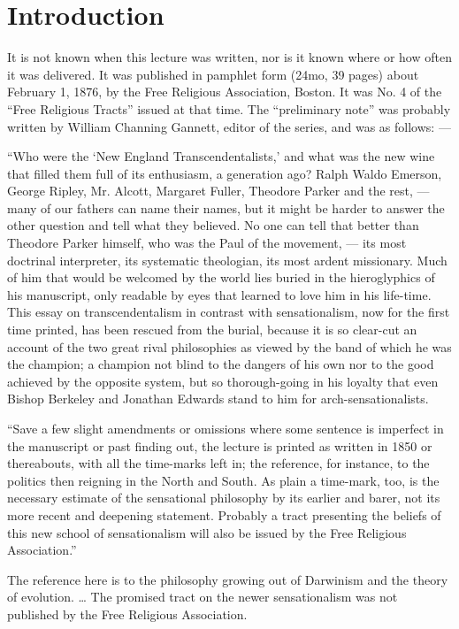 \documentclass[12pt]{article}
\begin{document}
\section*{Introduction}

It is not known when this lecture was written, nor is it known where or how often it was delivered. It was published in pamphlet form (24mo, 39 pages) about February 1, 1876, by the Free Religious Association, Boston. It was No. 4 of the ``Free Religious Tracts'' issued at that time. The ``preliminary note'' was probably written by William Channing Gannett, editor of the series, and was as follows: ---


``Who were the `New England Transcendentalists,' and what was the new wine that filled them full of its enthusiasm, a generation ago? Ralph Waldo Emerson, George Ripley, Mr. Alcott, Margaret Fuller, Theodore Parker and the rest, --- many of our fathers can name their names, but it might be harder to answer the other question and tell what they believed. No one can tell that better than Theodore Parker himself, who was the Paul of the movement, --- its most doctrinal interpreter, its systematic theologian, its most ardent missionary. Much of him that would be welcomed by the world lies buried in the hieroglyphics of his manuscript, only readable by eyes that learned to love him in his life-time. This essay on transcendentalism in contrast with sensationalism, now for the first time printed, has been rescued from the burial, because it is so clear-cut an account of the two great rival philosophies as viewed by the band of which he was the champion; a champion not blind to the dangers of his own nor to the good achieved by the opposite system, but so thorough-going in his loyalty that even Bishop Berkeley and Jonathan Edwards stand to him for arch-sensationalists. 

``Save a few slight amendments or omissions where some sentence is imperfect in the manuscript or past finding out, the lecture is printed as written in 1850 or thereabouts, with all the time-marks left in; the reference, for instance, to the politics then reigning in the North and South. As plain a time-mark, too, is the necessary estimate of the sensational philosophy by its earlier and barer, not its more recent and deepening statement. Probably a tract presenting the beliefs of this new school of sensationalism will also be issued by the Free Religious Association.''

The reference here is to the philosophy growing out of Darwinism and the theory of evolution.
\ldots
The promised tract on 
the newer sensationalism was not published by the Free 
Religious Association. 
\end{document}
